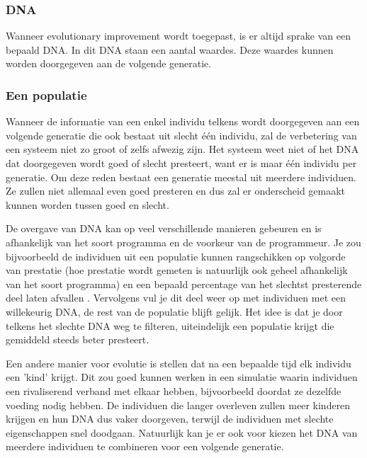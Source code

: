 \subsubsection{DNA}
Wanneer evolutionary improvement wordt toegepast, is er altijd sprake van een bepaald DNA. In dit DNA staan een aantal waardes. Deze waardes kunnen worden doorgegeven aan de volgende generatie.

\subsubsection{Een populatie}
Wanneer de informatie van een enkel individu telkens wordt doorgegeven aan een volgende generatie die ook bestaat uit slecht \'{e}\'{e}n individu, zal de verbetering van een systeem niet zo groot of zelfs afwezig zijn. Het systeem weet niet of het DNA dat doorgegeven wordt goed of slecht presteert, want er is maar \'{e}\'{e}n individu per generatie. Om deze reden bestaat een generatie meestal uit meerdere individuen. Ze zullen niet allemaal even goed presteren en dus zal er onderscheid gemaakt kunnen worden tussen goed en slecht.

De overgave van DNA kan op veel verschillende manieren gebeuren en is afhankelijk van het soort programma en de voorkeur van de programmeur. Je zou bijvoorbeeld de individuen uit een populatie kunnen rangschikken op volgorde van prestatie (hoe prestatie wordt gemeten is natuurlijk ook geheel afhankelijk van het soort programma) en een bepaald percentage van het slechtst presterende deel laten afvallen \cite{carrykh}. Vervolgens vul je dit deel weer op met individuen met een willekeurig DNA, de rest van de populatie blijft gelijk. Het idee is dat je door telkens het slechte DNA weg te filteren, uiteindelijk een populatie krijgt die gemiddeld steeds beter presteert.

Een andere manier voor evolutie is stellen dat na een bepaalde tijd elk individu een 'kind' krijgt. Dit zou goed kunnen werken in een simulatie waarin individuen een rivaliserend verband met elkaar hebben, bijvoorbeeld doordat ze dezelfde voeding nodig hebben. De individuen die langer overleven zullen meer kinderen krijgen en hun DNA dus vaker doorgeven, terwijl de individuen met slechte eigenschappen snel doodgaan. Natuurlijk kan je er ook voor kiezen het DNA van meerdere individuen te combineren voor een volgende generatie.

